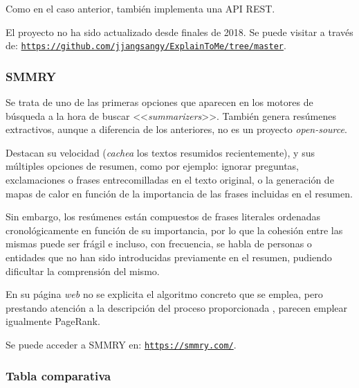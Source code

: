 Como en el caso anterior, también implementa una API REST.

El proyecto no ha sido actualizado desde finales de 2018. Se puede visitar a través de:
\href{https://github.com/jjangsangy/ExplainToMe/tree/master}{\texttt{{\small https://github.com/jjangsangy/ExplainToMe/tree/master}}}.


\bigskip
\subsubsection{SMMRY}

Se trata de uno de las primeras opciones que aparecen en los motores de búsqueda a la hora de buscar <<\emph{summarizers}>>. También genera resúmenes extractivos, aunque a diferencia de los anteriores, no es un proyecto \emph{open-source}.

Destacan su velocidad (\emph{cachea} los textos resumidos recientemente), y sus múltiples opciones de resumen, como por ejemplo: ignorar preguntas, exclamaciones o frases entrecomilladas en el texto original, o la generación de mapas de calor en función de la importancia de las frases incluidas en el resumen.

Sin embargo, los resúmenes están compuestos de frases literales ordenadas cronológicamente en función de su importancia, por lo que la cohesión entre las mismas puede ser frágil e incluso, con frecuencia, se habla de personas o entidades que no han sido introducidas previamente en el resumen, pudiendo dificultar la comprensión del mismo.

En su página \emph{web} no se explicita el algoritmo concreto que se emplea, pero prestando atención a la descripción del proceso proporcionada \cite{smmry}, parecen emplear igualmente PageRank.

Se puede acceder a SMMRY en:
\href{https://smmry.com/}{\texttt{{\small https://smmry.com/}}}.

\bigskip
\subsubsection{Tabla comparativa}


